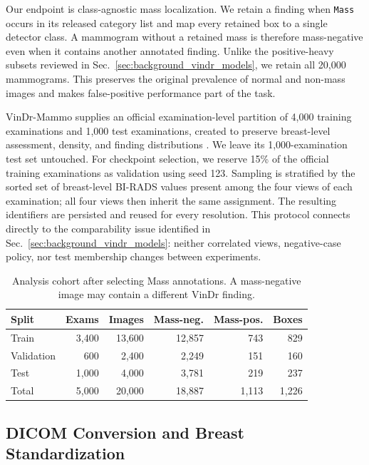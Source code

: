 Our endpoint is class-agnostic mass localization.  We retain a finding when
\texttt{Mass} occurs in its released category list and map every retained box
to a single detector class.  A mammogram without a retained mass is therefore
mass-negative even when it contains another annotated finding.  Unlike the
positive-heavy subsets reviewed in Sec.~\ref{sec:background_vindr_models}, we
retain all 20,000 mammograms.  This preserves the original prevalence of normal
and non-mass images and makes false-positive performance part of the task.

VinDr-Mammo supplies an official examination-level partition of 4,000 training
examinations and 1,000 test examinations, created to preserve breast-level
assessment, density, and finding distributions \cite{nguyen2023vindr}.  We
leave its 1,000-examination test set untouched.  For checkpoint selection, we
reserve 15\% of the official training examinations as validation using seed
123.  Sampling is stratified by the sorted set of breast-level BI-RADS values
present among the four views of each examination; all four views then inherit
the same assignment.  The resulting identifiers are persisted and reused for
every resolution.  This protocol connects directly to the comparability issue
identified in Sec.~\ref{sec:background_vindr_models}: neither correlated views,
negative-case policy, nor test membership changes between experiments.

\begin{table}[t]
\centering
\caption{Analysis cohort after selecting Mass annotations. A mass-negative
image may contain a different VinDr finding.}
\label{tab:dataset_split_counts}
\scriptsize
\setlength{\tabcolsep}{3.2pt}
\begin{tabular}{@{}lrrrrr@{}}
\toprule
Split & Exams & Images & Mass-neg. & Mass-pos. & Boxes \\
\midrule
Train & 3,400 & 13,600 & 12,857 & 743 & 829 \\
Validation & 600 & 2,400 & 2,249 & 151 & 160 \\
Test & 1,000 & 4,000 & 3,781 & 219 & 237 \\
\midrule
Total & 5,000 & 20,000 & 18,887 & 1,113 & 1,226 \\
\bottomrule
\end{tabular}
\end{table}

\subsection{DICOM Conversion and Breast Standardization}
\label{sec:dataset_preprocessing}

